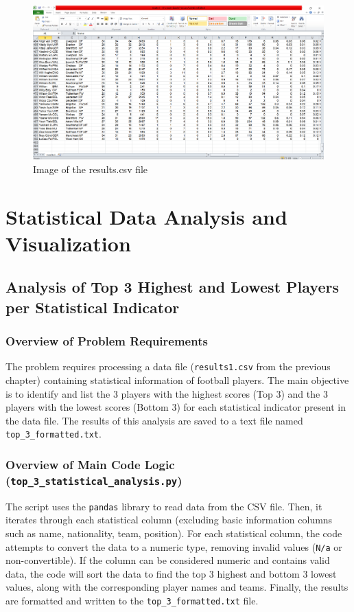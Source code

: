 \documentclass[12pt, a4paper]{report}
\begin{document}
\begin{figure}[h]
    \centering
    \includegraphics[width=\textwidth]{results.png}
    \caption{Image of the results.csv file}
    \label{fig:results.csv}
\end{figure}

\chapter{Statistical Data Analysis and Visualization}

\section{Analysis of Top 3 Highest and Lowest Players per Statistical Indicator}

\subsection{Overview of Problem Requirements}
The problem requires processing a data file (\texttt{results1.csv} from the previous chapter) containing statistical information of football players.
The main objective is to identify and list the 3 players with the highest scores (Top 3) and the 3 players with the lowest scores (Bottom 3) for each statistical indicator present in the data file.
The results of this analysis are saved to a text file named \texttt{top\_3\_formatted.txt}.

\subsection{Overview of Main Code Logic \newline (\texttt{top\_3\_statistical\_analysis.py})}
The script uses the \texttt{pandas} library to read data from the CSV file.
Then, it iterates through each statistical column (excluding basic information columns such as name, nationality, team, position).
For each statistical column, the code attempts to convert the data to a numeric type, removing invalid values (\texttt{N/a} or non-convertible).
If the column can be considered numeric and contains valid data, the code will sort the data to find the top 3 highest and bottom 3 lowest values, along with the corresponding player names and teams.
Finally, the results are formatted and written to the \texttt{top\_3\_formatted.txt} file.
\end{document}
